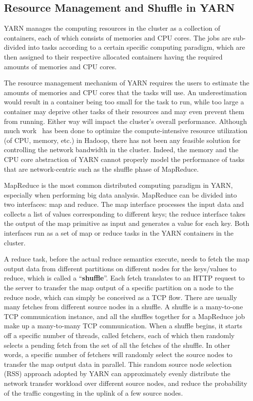 \documentclass[10pt,journal,compsoc]{IEEEtran}
\begin{document}
\subsection{Resource Management and Shuffle in YARN}

YARN manages the computing resources in the cluster as a collection
of containers, each of which consists of memories and CPU cores. The
jobs are sub-divided into tasks according to a certain specific
computing paradigm, which are then assigned to their respective allocated
containers
having the required amounts of memories and CPU cores.

 
The resource management mechanism of YARN requires the users to
estimate the amounts of memories and CPU cores that the tasks will use.
An underestimation would result in a container being too small for the task
to run, while too large a container may deprive other tasks of their
resources and may even prevent them from running. Either way
will impact the cluster's overall performance. 
Although much work~\cite{Delimitrou:2014:QRQ, smapreduce} has been done to optimize the compute-intensive
resource utilization (of CPU, memory, etc.) in
Hadoop, there has not been any
feasible solution for controlling the network bandwidth in the
cluster.
Indeed,
the memory and the CPU core abstraction of YARN cannot properly model the
performance of tasks that are network-centric such as
the shuffle phase of MapReduce. 
 
MapReduce is the most common distributed computing paradigm in YARN,
especially when performing big data analysis. MapReduce can be divided
into two interfaces: map and reduce.
The map interface processes the input data and collects a list of
values corresponding to different keys;
the reduce interface takes the output of the map primitive as
input and generates a value for each key.
Both interfaces run as a set of map or reduce tasks in the YARN
containers in the cluster.

A reduce task, before the actual reduce semantics execute,
needs to fetch the map output data from
different partitions on different nodes for the keys/values to reduce,
which is called a ``\textbf{shuffle}''.
Each fetch translates to an HTTP request to the server to transfer the
map output of a specific partition on a node to the reduce node,
which can simply be conceived as a TCP flow. 
There are usually many fetches from different source nodes in a shuffle. 
A shuffle is a many-to-one TCP communication instance, 
and all the shuffles together for a MapReduce job
make up a many-to-many TCP communication. 
When a shuffle begins, it starts off a specific number of threads, called
fetchers, each of which then randomly selects a pending fetch from the set
of all the fetches of the shuffle.
In other words, a specific number of fetchers will randomly select the
source nodes to transfer the map output data in parallel. 
This random source node selection (RSS) approach adopted by YARN can
approximately evenly distribute the network transfer workload
over different source nodes, and reduce the probability of the traffic
congesting in the uplink of a few source nodes.
\end{document}
